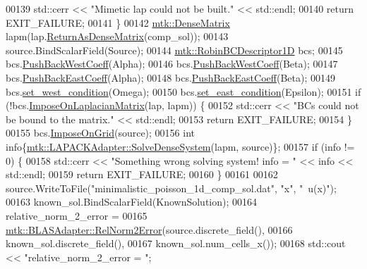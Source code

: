 \begin{DoxyCode}
00139     std::cerr << \textcolor{stringliteral}{"Mimetic lap could not be built."} << std::endl;
00140     \textcolor{keywordflow}{return} EXIT\_FAILURE;
00141   \}
00142   \hyperlink{classmtk_1_1DenseMatrix}{mtk::DenseMatrix} lapm(lap.\hyperlink{classmtk_1_1Lap1D_aaea34a17b0879e05eb4109645a2ba8f4}{ReturnAsDenseMatrix}(comp\_sol));
00143   source.BindScalarField(Source);
00144   \hyperlink{classmtk_1_1RobinBCDescriptor1D}{mtk::RobinBCDescriptor1D} bcs;
00145   bcs.\hyperlink{classmtk_1_1RobinBCDescriptor1D_acdf8a75f8c39b3b8a032af81e0fd2e89}{PushBackWestCoeff}(Alpha);
00146   bcs.\hyperlink{classmtk_1_1RobinBCDescriptor1D_acdf8a75f8c39b3b8a032af81e0fd2e89}{PushBackWestCoeff}(Beta);
00147   bcs.\hyperlink{classmtk_1_1RobinBCDescriptor1D_a7791c11e0950656cb5608a77918c28d4}{PushBackEastCoeff}(Alpha);
00148   bcs.\hyperlink{classmtk_1_1RobinBCDescriptor1D_a7791c11e0950656cb5608a77918c28d4}{PushBackEastCoeff}(Beta);
00149   bcs.\hyperlink{classmtk_1_1RobinBCDescriptor1D_a06bfaf0126d528247c3c76fdd19f4b85}{set\_west\_condition}(Omega);
00150   bcs.\hyperlink{classmtk_1_1RobinBCDescriptor1D_a4edc92eeaaaa3f1e7f2cedfea3d35681}{set\_east\_condition}(Epsilon);
00151   \textcolor{keywordflow}{if} (!bcs.\hyperlink{classmtk_1_1RobinBCDescriptor1D_ab8446428df923c27f388a85bd3f2c6d4}{ImposeOnLaplacianMatrix}(lap, lapm)) \{
00152     std::cerr << \textcolor{stringliteral}{"BCs  could not be bound to the matrix."} << std::endl;
00153     \textcolor{keywordflow}{return} EXIT\_FAILURE;
00154   \}
00155   bcs.\hyperlink{classmtk_1_1RobinBCDescriptor1D_ab0daec1d6c5c9c6768bea08281a3831d}{ImposeOnGrid}(source);
00156   \textcolor{keywordtype}{int} info\{\hyperlink{classmtk_1_1LAPACKAdapter_a7428bccf74fd4a4af68fb7233846da22}{mtk::LAPACKAdapter::SolveDenseSystem}(lapm, source)\};
00157   \textcolor{keywordflow}{if} (info != 0) \{
00158     std::cerr << \textcolor{stringliteral}{"Something wrong solving system! info = "} << info << std::endl;
00159     \textcolor{keywordflow}{return} EXIT\_FAILURE;
00160   \}
00161 
00162   source.WriteToFile(\textcolor{stringliteral}{"minimalistic\_poisson\_1d\_comp\_sol.dat"}, \textcolor{stringliteral}{"x"}, \textcolor{stringliteral}{"~u(x)"});
00163   known\_sol.BindScalarField(KnownSolution);
00164   relative\_norm\_2\_error =
00165     \hyperlink{classmtk_1_1BLASAdapter_af2ac5691f45e67d6e26186b071119ec4}{mtk::BLASAdapter::RelNorm2Error}(source.discrete\_field(),
00166                                     known\_sol.discrete\_field(),
00167                                     known\_sol.num\_cells\_x());
00168   std::cout << \textcolor{stringliteral}{"relative\_norm\_2\_error = "};

\end{DoxyCode}

